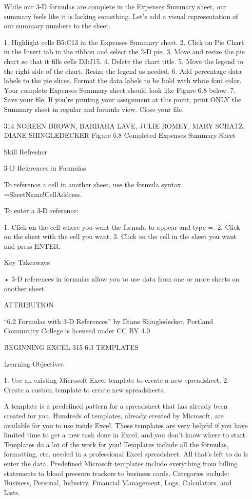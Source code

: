 While our 3-D formulas are complete in the Expenses Summary sheet, our summary feels like it is
lacking something. Let’s add a visual representation of our summary numbers to the sheet.

1. Highlight cells B5:C13 in the Expenses Summary sheet.
2. Click on Pie Chart in the Insert tab in the ribbon and select the 2-D pie.
3. Move and resize the pie chart so that it fills cells D3:J15.
4. Delete the chart title.
5. Move the legend to the right side of the chart. Resize the legend as needed.
6. Add percentage data labels to the pie slices. Format the data labels to be bold with white font
color. Your complete Expenses Summary sheet should look like Figure 6.8 below.
7. Save your file. If you’re printing your assignment at this point, print ONLY the Summary sheet
in regular and formula view. Close your file.




314 NOREEN BROWN, BARBARA LAVE, JULIE ROMEY, MARY SCHATZ, DIANE SHINGLEDECKER
Figure 6.8 Completed Expenses Summary Sheet




Skill Refresher


3-D References in Formulas

To reference a cell in another sheet, use the formula syntax =SheetName!CellAddress.

To enter a 3-D reference:

1. Click on the cell where you want the formula to appear and type =.
2. Click on the sheet with the cell you want.
3. Click on the cell in the sheet you want and press ENTER.




Key Takeaways


• 3-D references in formulas allow you to use data from one or more sheets on another sheet.



ATTRIBUTION

“6.2 Formulas with 3-D References” by Diane Shingledecker, Portland Community College is licensed
under CC BY 4.0

BEGINNING EXCEL 315
6.3 TEMPLATES




Learning Objectives


1. Use an existing Microsoft Excel template to create a new spreadsheet.
2. Create a custom template to create new spreadsheets.



A template is a predefined pattern for a spreadsheet that has already been created for you. Hundreds
of templates, already created by Microsoft, are available for you to use inside Excel. These templates
are very helpful if you have limited time to get a new task done in Excel, and you don’t know where
to start. Templates do a lot of the work for you! Templates include all the formulas, formatting, etc.
needed in a professional Excel spreadsheet. All that’s left to do is enter the data. Predefined Microsoft
templates include everything from billing statements to blood pressure trackers to business cards.
Categories include: Business, Personal, Industry, Financial Management, Logs, Calculators, and Lists.

